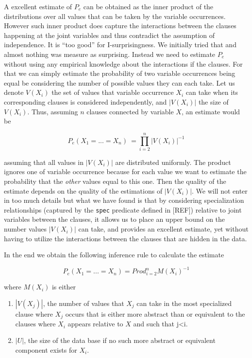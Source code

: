 \documentclass[runningheads]{llncs}
\begin{document}
A excellent estimate of $P_e$ can be obtained as the inner product of
the distributions over all values that can be taken by the variable
occurrences. However such inner product does capture the interactions
between the clauses happening at the joint variables and thus
contradict the assumption of independence. It is ``too good'' for
I-surprisingness. We initially tried that and almost nothing was
measure as surprising. Instead we need to estimate $P_e$ without using
any empirical knowledge about the interactions if the clauses. For
that we can simply estimate the probability of two variable
occurrences being equal be considering the number of possible values
they can each take. Let us denote $V(X_i)$ the set of values that
variable occurrence $X_i$ can take when its corresponding clauses is
considered independently, and $|V(X_i)|$ the size of $V(X_i)$. Thus,
assuming $n$ clauses connected by variable $X$, an estimate would be

$$
P_e(X_1=...=X_n)~=\prod_{i=2}^n |V(X_i)|^{-1}
$$

assuming that all values in $|V(X_i)|$ are distributed uniformly. The
product ignores one of variable occurrence because for each value we
want to estimate the probability that the \emph{other} values equal to
this one. Then the quality of the estimate depends on the quality of
the estimations of $|V(X_i)|$. We will not enter in too much details
but what we have found is that by considering specialization
relationships (captured by the \texttt{spec} predicate defined in
[REF]) relative to joint variables between the clauses, it allows us
to place an upper bound on the number values $|V(X_i)|$ can take, and
provides an excellent estimate, yet without having to utilize the
interactions between the clauses that are hidden in the data.

In the end we obtain the following inference rule to calculate the
estimate

$$
P_e(X_1=...=X_n) = Prod_{i=2}^n M(X_i)^{-1}
$$

where $M(X_i)$ is either
\begin{enumerate}
\item $|V(X_j)|$, the number of values that $X_j$ can take in the most
  specialized clause where $X_j$ occurs that is either more abstract
  than or equivalent to the clauses where $X_i$ appears relative to
  $X$ and such that j<i.
\item $|U|$, the size of the data base if no such more abstract or
  equivalent component exists for $X_i$.
\end{enumerate}
\end{document}
